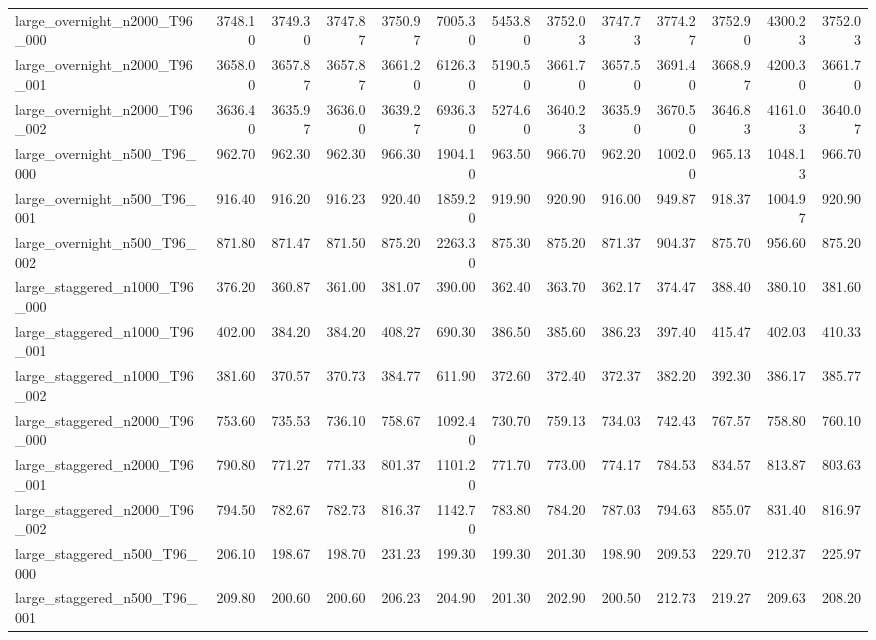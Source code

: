 \begin{table}[htbp]
\begin{tabular}{lrrrrrrrrrrrr}
large\_overnight\_n2000\_T96\_000 & 3748.10 & 3749.30 & 3747.87 & 3750.97 & 7005.30 & 5453.80 & 3752.03 & 3747.73 & 3774.27 & 3752.90 & 4300.23 & 3752.03 \\
large\_overnight\_n2000\_T96\_001 & 3658.00 & 3657.87 & 3657.87 & 3661.20 & 6126.30 & 5190.50 & 3661.70 & 3657.50 & 3691.40 & 3668.97 & 4200.30 & 3661.70 \\
large\_overnight\_n2000\_T96\_002 & 3636.40 & 3635.97 & 3636.00 & 3639.27 & 6936.30 & 5274.60 & 3640.23 & 3635.90 & 3670.50 & 3646.83 & 4161.03 & 3640.07 \\
large\_overnight\_n500\_T96\_000 & 962.70 & 962.30 & 962.30 & 966.30 & 1904.10 & 963.50 & 966.70 & 962.20 & 1002.00 & 965.13 & 1048.13 & 966.70 \\
large\_overnight\_n500\_T96\_001 & 916.40 & 916.20 & 916.23 & 920.40 & 1859.20 & 919.90 & 920.90 & 916.00 & 949.87 & 918.37 & 1004.97 & 920.90 \\
large\_overnight\_n500\_T96\_002 & 871.80 & 871.47 & 871.50 & 875.20 & 2263.30 & 875.30 & 875.20 & 871.37 & 904.37 & 875.70 & 956.60 & 875.20 \\
large\_staggered\_n1000\_T96\_000 & 376.20 & 360.87 & 361.00 & 381.07 & 390.00 & 362.40 & 363.70 & 362.17 & 374.47 & 388.40 & 380.10 & 381.60 \\
large\_staggered\_n1000\_T96\_001 & 402.00 & 384.20 & 384.20 & 408.27 & 690.30 & 386.50 & 385.60 & 386.23 & 397.40 & 415.47 & 402.03 & 410.33 \\
large\_staggered\_n1000\_T96\_002 & 381.60 & 370.57 & 370.73 & 384.77 & 611.90 & 372.60 & 372.40 & 372.37 & 382.20 & 392.30 & 386.17 & 385.77 \\
large\_staggered\_n2000\_T96\_000 & 753.60 & 735.53 & 736.10 & 758.67 & 1092.40 & 730.70 & 759.13 & 734.03 & 742.43 & 767.57 & 758.80 & 760.10 \\
large\_staggered\_n2000\_T96\_001 & 790.80 & 771.27 & 771.33 & 801.37 & 1101.20 & 771.70 & 773.00 & 774.17 & 784.53 & 834.57 & 813.87 & 803.63 \\
large\_staggered\_n2000\_T96\_002 & 794.50 & 782.67 & 782.73 & 816.37 & 1142.70 & 783.80 & 784.20 & 787.03 & 794.63 & 855.07 & 831.40 & 816.97 \\
large\_staggered\_n500\_T96\_000 & 206.10 & 198.67 & 198.70 & 231.23 & 199.30 & 199.30 & 201.30 & 198.90 & 209.53 & 229.70 & 212.37 & 225.97 \\
large\_staggered\_n500\_T96\_001 & 209.80 & 200.60 & 200.60 & 206.23 & 204.90 & 201.30 & 202.90 & 200.50 & 212.73 & 219.27 & 209.63 & 208.20 \\

\end{tabular}
\end{table}
